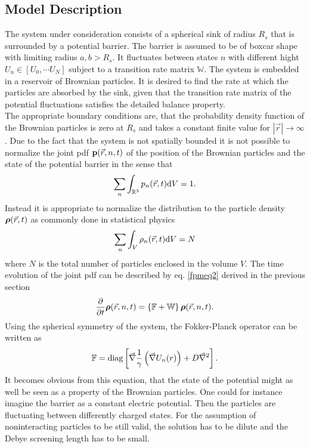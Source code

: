 \subsection{Model Description}
\label{Model_Description}
The system under consideration consists of a spherical sink of radius $R_s$ that is surrounded by a potential barrier. The barrier is assumed to be of boxcar shape with limiting radius $a,b>R_s$. It fluctuates between states $n$ with different hight $U_n \in [U_0, \cdots U_N]$ subject to a transition rate matrix $\mathbb{W}$. The system is embedded in a reservoir of Brownian particles. It is desired to find the rate at which the particles are absorbed by the sink, given that the transition rate matrix of the potential fluctuations satisfies the detailed balance property.\\
The appropriate boundary conditions are, that the probability density function of the Brownian particles is zero at $R_s$ and takes a constant finite value for $|\vec{r}| \rightarrow \infty$. Due to the fact that the system is not spatially bounded it is not possible to normalize the joint pdf $\boldsymbol{\mathbf{p}}(\vec{r},n,t)$ of the position of the Brownian particles and the state of the potential barrier in the sense that 
\begin{equation}
    \sum_n \int_{\mathbb{R}^{3}} p_n(\vec{r},t) {\rm d}V = 1.
    \label{pdfNormalization}
\end{equation}
Instead it is appropriate to normalize the distribution to the particle density $\boldsymbol{\mathbf{\rho}}(\vec{r},t)$ as commonly done in statistical physics
\begin{equation}
    \sum_n \int_V \rho_n(\vec{r},t) {\rm d}V = N
    \label{densNormalisation}
\end{equation}
where $N$ is the total number of particles enclosed in the volume $V$. The time evolution of the joint pdf can be described by eq. \eqref{fpmeq2} derived in the previous section
\begin{equation}
    \frac{\partial}{\partial t}\boldsymbol{\mathbf{\rho}}(\vec{r},n,t) = \left\{ \mathbb{F} + \mathbb{W} \right\} \boldsymbol{\mathbf{\rho}}(\vec{r},n,t).
    \label{fpmeq3}
\end{equation}
Using the spherical symmetry of the system, the Fokker-Planck operator can be written as
\begin{equation}
    \mathbb{F} = {\rm diag}\left[ \vec{\nabla}\frac{1}{\gamma}\left( \vec{\nabla} U_n(r) \right)+ D \vec{\nabla}^{2} \right].
    \label{fpo2}
\end{equation}
It becomes obvious from this equation, that the state of the potential might as well be seen as a property of the Brownian particles. One could for instance imagine the barrier as a constant electric potential. Then the particles are fluctuating between differently charged states. For the assumption of noninteracting particles to be still valid, the solution has to be dilute and the Debye screening length has to be small. \\
